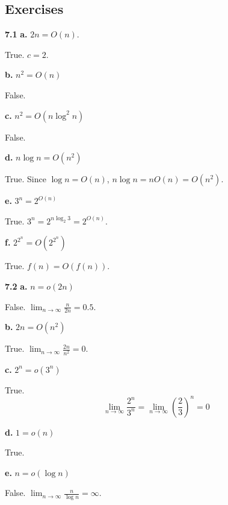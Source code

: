 \subsection{Exercises}

\textbf{7.1}
\textbf{a.} $2n = O(n)$.
\begin{mdframed}
True. $c = 2$.
\end{mdframed}

\textbf{b.} $n^2 = O(n)$
\begin{mdframed}
False. 
\end{mdframed}

\textbf{c.} $n^2 = O(n \log^2 n)$
\begin{mdframed}
False. 
\end{mdframed}

\textbf{d.} $n \log n = O(n^2)$
\begin{mdframed}
True. Since $\log n = O(n)$, $n \log n = n O(n) = O(n^2)$.
\end{mdframed}

\textbf{e.} $3^n = 2^{O(n)}$
\begin{mdframed}
True. $3^n = 2^{n \log_2 3} = 2^{O(n)}$.
\end{mdframed}

\textbf{f.} $2^{2^n} = O(2^{2^n})$
\begin{mdframed}
True. $f(n) = O(f(n))$.
\end{mdframed}

\textbf{7.2} 
\textbf{a.} $n = o(2n)$
\begin{mdframed}
False. $\lim_{n\rightarrow\infty} \frac{n}{2n} = 0.5$.
\end{mdframed}

\textbf{b.} $2n = O(n^2)$
\begin{mdframed}
True. $\lim_{n\rightarrow\infty} \frac{2n}{n^2} = 0$.
\end{mdframed}

\textbf{c.} $2^n = o(3^n)$
\begin{mdframed}
True.
\[
\lim_{n\rightarrow \infty} \frac{2^n}{3^n} = \lim_{n\rightarrow \infty} \left(\frac{2}{3}\right)^n = 0
\]
\end{mdframed}

\textbf{d.} $1 = o(n)$
\begin{mdframed}
True.
\end{mdframed}

\textbf{e.} $n = o(\log n)$
\begin{mdframed}
False.  $\lim_{n\rightarrow\infty} \frac{n}{\log n} = \infty$.
\end{mdframed}


